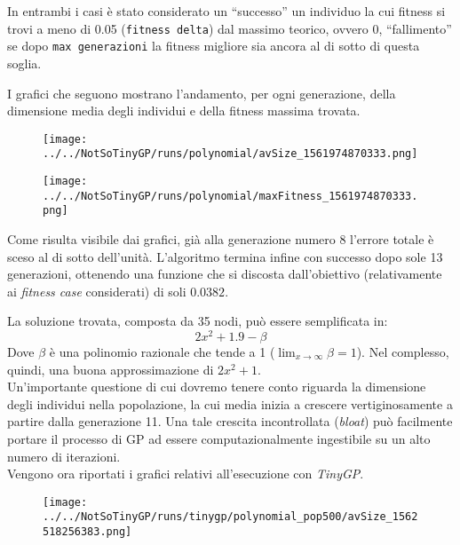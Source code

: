 \documentclass{../llncs}
\newcommand{\labelfig}[1]{\label{fig:#1}}
\begin{document}
In entrambi i casi è stato considerato un ``successo'' un individuo la cui fitness si trovi a meno di 0.05 (\texttt{fitness delta}) dal massimo teorico, ovvero 0, ``fallimento'' se dopo \texttt{max generazioni} la fitness migliore sia ancora al di sotto di questa soglia.

I grafici che seguono mostrano l'andamento, per ogni generazione, della dimensione %
media degli individui e della fitness massima trovata.


\begin{figure}[!htb]
\centering
\texttt{[image: ../../NotSoTinyGP/runs/polynomial/avSize\_1561974870333.png]}
\end{figure}

\begin{figure}[!htb]
\centering
\texttt{[image: ../../NotSoTinyGP/runs/polynomial/maxFitness\_1561974870333.png]}
\end{figure}

Come risulta visibile dai grafici, già alla generazione numero 8 l'errore totale è sceso al di sotto dell'unità.
L'algoritmo termina infine con successo dopo sole 13 generazioni, ottenendo una funzione che si discosta dall'obiettivo (relativamente ai \emph{fitness case} considerati) di soli $0.0382$. 

\noindent La soluzione trovata, composta da 35 nodi, può essere semplificata in:
\[
2x^2 + 1.9 - \beta
\]
Dove $\beta$ è una polinomio razionale che tende a 1 ($\lim_{x \to \infty} \beta = 1$). Nel complesso, quindi, una buona approssimazione di $2x^2+1$.\\

Un'importante questione di cui dovremo tenere conto riguarda la dimensione degli individui nella popolazione, la cui media inizia a crescere vertiginosamente a partire dalla generazione 11. Una tale crescita incontrollata (\emph{bloat}) può facilmente portare il processo di GP ad essere computazionalmente ingestibile su un alto numero di iterazioni.\\

\noindent Vengono ora riportati i grafici relativi all'esecuzione con \emph{TinyGP}.

\begin{figure}[!htb]
\centering
\texttt{[image: ../../NotSoTinyGP/runs/tinygp/polynomial\_pop500/avSize\_1562518256383.png]}
\end{figure}
\end{document}
